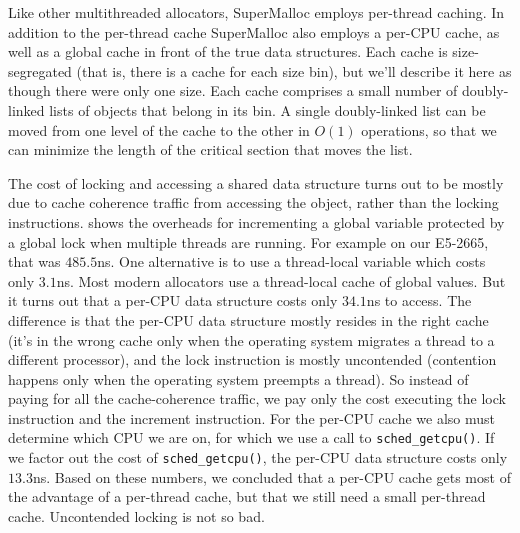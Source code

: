 \documentclass[pldi]{sigplanconf-pldi15}
\newcommand{\code}[1]{\texttt{#1}}
\begin{document}

Like other multithreaded allocators, SuperMalloc employs per-thread
caching.  In addition to the per-thread cache SuperMalloc also employs
a per-CPU cache, as well as a global cache in front of the true data
structures.  Each cache is size-segregated (that is, there is a cache
for each size bin), but we'll describe it here as though there were
only one size.  Each cache comprises a small number of doubly-linked
lists of objects that belong in its bin.  A single doubly-linked list
can be moved from one level of the cache to the other in $O(1)$
operations, so that we can minimize the length of the critical section
that moves the list.

The cost of locking and accessing a shared data structure turns out to
be mostly due to cache coherence traffic from accessing the object,
rather than the locking instructions.   shows the
overheads for incrementing a global variable protected by a global
lock when multiple threads are running.  For example on our E5-2665,
that was $485.5$ns.  One alternative is to use a thread-local variable
which costs only $3.1$ns.  Most modern allocators use a thread-local
cache of global values.  But it turns out that a per-CPU data
structure costs only $34.1$ns to access.  The difference is that the
per-CPU data structure mostly resides in the right cache (it's in the
wrong cache only when the operating system migrates a thread to a
different processor), and the lock instruction is mostly uncontended
(contention happens only when the operating system preempts a thread).
So instead of paying for all the cache-coherence traffic, we pay only
the cost executing the lock instruction and the increment instruction.
For the per-CPU cache we also must determine which CPU we are on, for
which we use a call to \code{sched_getcpu()}.  If we factor out the
cost of \code{sched_getcpu()}, the per-CPU data structure costs only
$13.3$ns.  Based on these numbers, we concluded that a per-CPU cache
gets most of the advantage of a per-thread cache, but that we still
need a small per-thread cache.  Uncontended locking is not so bad.
\end{document}
